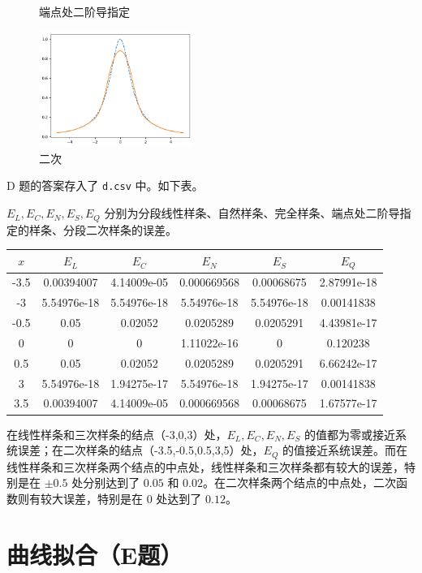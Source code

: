 \documentclass{ctexart}
\begin{document}
\begin{figure}[htbp]
\begin{minipage}{5cm}
    \caption{端点处二阶导指定}
    \label{c4}
\end{minipage}
\begin{minipage}{5cm}
    \centering
    \includegraphics[width=5cm]{c5.png}
    \caption{二次}
    \label{c5}
\end{minipage}
\end{figure}

D 题的答案存入了 \verb|d.csv| 中。如下表。

$E_L,E_C,E_N,E_S,E_Q$ 分别为分段线性样条、自然样条、完全样条、端点处二阶导指定的样条、分段二次样条的误差。

\begin{tabular}{|c|c|c|c|c|c|} \hline
$x$ & $E_L$ & $E_C$ & $E_N$ & $E_S$ & $E_Q$  \\ \hline
-3.5 & 0.00394007 & 4.14009e-05 & 0.000669568 & 0.00068675 & 2.87991e-18 \\ \hline
-3 & 5.54976e-18 & 5.54976e-18 & 5.54976e-18 & 5.54976e-18 & 0.00141838 \\ \hline
-0.5 & 0.05 & 0.02052 & 0.0205289 & 0.0205291 & 4.43981e-17 \\ \hline
0 & 0 & 0 & 1.11022e-16 & 0 & 0.120238 \\ \hline
0.5 & 0.05 & 0.02052 & 0.0205289 & 0.0205291 & 6.66242e-17 \\ \hline
3 & 5.54976e-18 & 1.94275e-17 & 5.54976e-18 & 1.94275e-17 & 0.00141838 \\ \hline
3.5 & 0.00394007 & 4.14009e-05 & 0.000669568 & 0.00068675 & 1.67577e-17 \\ \hline
\end{tabular}

在线性样条和三次样条的结点（-3,0,3）处，$E_L,E_C,E_N,E_S$ 的值都为零或接近系统误差；在二次样条的结点（-3.5,-0.5,0.5,3,5）处，$E_Q$ 的值接近系统误差。而在线性样条和三次样条两个结点的中点处，线性样条和三次样条都有较大的误差，特别是在 $\pm 0.5$ 处分别达到了 $0.05$ 和 $0.02$。在二次样条两个结点的中点处，二次函数则有较大误差，特别是在 $0$ 处达到了 $0.12$。

\section{曲线拟合（E题）}
\end{document}
